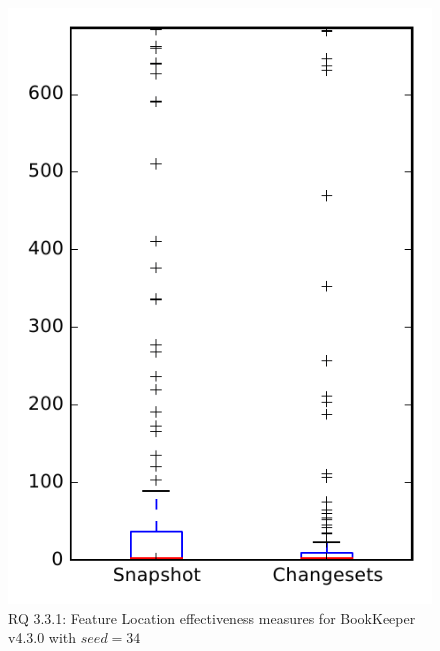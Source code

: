 
\begin{figure}
\centering
\includegraphics[height=0.4\textheight]{figures/flt_seed/rq1_bookkeeper_34}
\caption{RQ 3.3.1: Feature Location effectiveness measures for BookKeeper v4.3.0 with $seed=34$}
\label{fig:flt_seed:rq1:bookkeeper}
\end{figure}
